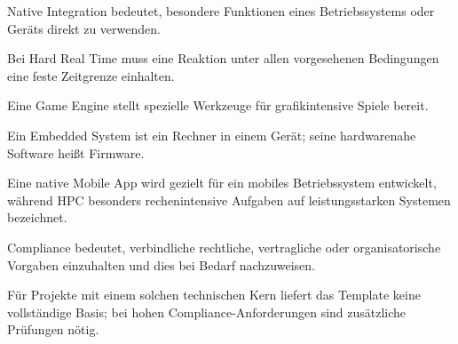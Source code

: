\begin{beginnerstatement}

Native Integration bedeutet, besondere Funktionen eines Betriebssystems oder
Geräts direkt zu verwenden.

Bei Hard Real Time muss eine Reaktion unter allen vorgesehenen Bedingungen
eine feste Zeitgrenze einhalten.

Eine Game Engine stellt spezielle Werkzeuge für grafikintensive Spiele bereit.

Ein Embedded System ist ein Rechner in einem Gerät; seine hardwarenahe
Software heißt Firmware.

Eine native Mobile App wird gezielt für ein mobiles Betriebssystem entwickelt,
während HPC besonders rechenintensive Aufgaben auf leistungsstarken Systemen
bezeichnet.

Compliance bedeutet, verbindliche rechtliche, vertragliche oder
organisatorische Vorgaben einzuhalten und dies bei Bedarf nachzuweisen.

Für Projekte mit einem solchen technischen Kern liefert das Template keine
vollständige Basis; bei hohen Compliance-Anforderungen sind zusätzliche
Prüfungen nötig.

\end{beginnerstatement}
